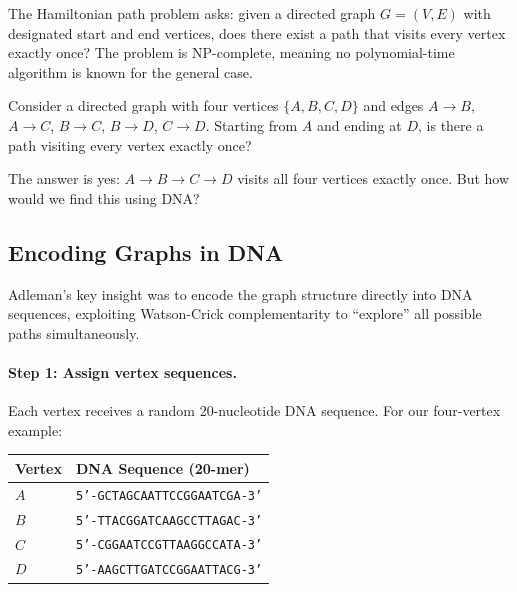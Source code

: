 The Hamiltonian path problem asks: given a directed graph $G = (V, E)$ with designated start and end vertices, does there exist a path that visits every vertex exactly once? The problem is NP-complete, meaning no polynomial-time algorithm is known for the general case.

\begin{example}
Consider a directed graph with four vertices $\{A, B, C, D\}$ and edges $A \to B$, $A \to C$, $B \to C$, $B \to D$, $C \to D$. Starting from $A$ and ending at $D$, is there a path visiting every vertex exactly once?

\begin{center}
\end{center}

The answer is yes: $A \to B \to C \to D$ visits all four vertices exactly once. But how would we find this using DNA?
\end{example}

\subsection{Encoding Graphs in DNA}

Adleman's key insight was to encode the graph structure directly into DNA sequences, exploiting Watson-Crick complementarity to ``explore'' all possible paths simultaneously.

\paragraph{Step 1: Assign vertex sequences.}
Each vertex receives a random 20-nucleotide DNA sequence. For our four-vertex example:

\begin{center}
\renewcommand{\arraystretch}{1.15}
\begin{tabular}{ll}
\toprule
\textbf{Vertex} & \textbf{DNA Sequence (20-mer)} \\
\midrule
$A$ & \texttt{5'-GCTAGCAATTCCGGAATCGA-3'} \\
$B$ & \texttt{5'-TTACGGATCAAGCCTTAGAC-3'} \\
$C$ & \texttt{5'-CGGAATCCGTTAAGGCCATA-3'} \\
$D$ & \texttt{5'-AAGCTTGATCCGGAATTACG-3'} \\
\bottomrule
\end{tabular}
\end{center}

